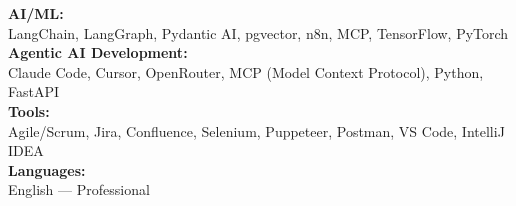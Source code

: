 \begin{itemize}[leftmargin=0.15in, label={}]
{{     \textbf{AI/ML:} \\
     \quad \textbullet{} LangChain, LangGraph, Pydantic AI, pgvector, n8n, MCP, TensorFlow, PyTorch \\ \vspace{2pt}
     \textbf{Agentic AI Development:} \\
     \quad \textbullet{} Claude Code, Cursor, OpenRouter, MCP (Model Context Protocol), Python, FastAPI \\ \vspace{2pt}
     \textbf{Tools:} \\
     \quad \textbullet{} Agile/Scrum, Jira, Confluence, Selenium, Puppeteer, Postman, VS Code, IntelliJ IDEA \\ \vspace{2pt}
     \textbf{Languages:} \\
     \quad \textbullet{} English — Professional
    }}
 \end{itemize}